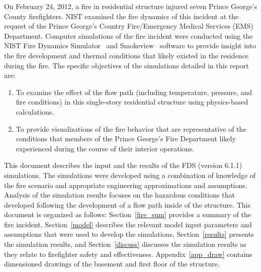 \documentclass[12pt,oneside]{book}
\begin{document}
On February 24, 2012, a fire in residential structure injured seven Prince George's County firefighters. NIST examined the fire dynamics of this incident at the request of the Prince George's Country Fire/Emergency Medical Services (EMS) Department. Computer simulations of the fire incident were conducted using the NIST Fire Dynamics Simulator~\cite{FDS_Users_Guide} and Smokeview~\cite{Smokeview_Users_Guide}  software to provide insight into the fire development and thermal conditions that likely existed in the residence during the fire. The specific objectives of the simulations detailed in this report are: 
\begin{enumerate}
\item To examine the effect of the flow path (including temperature, pressure, and fire conditions) in this single-story residential structure using physics-based calculations.
\item To provide visualizations of the fire behavior that are representative of the conditions that members of the Prince George's Fire Department likely experienced during the course of their interior operations.
\end{enumerate}

This document describes the input and the results of the FDS (version 6.1.1) simulations. The simulations were developed using a combination of knowledge of the fire scenario and appropriate engineering approximations and assumptions. Analysis of the simulation results focuses on the hazardous conditions that developed following the development of a flow path inside of the structure. This document is organized as follows: Section~\ref{fire_sum} provides a summary of the fire incident, Section~\ref{model} describes the relevant model input parameters and assumptions that were used to develop the simulations, Section~\ref{results} presents the simulation results, and Section~\ref{discuss} discusses the simulation results as they relate to firefighter safety and effectiveness. Appendix~\ref{app_draw} contains dimensioned drawings of the basement and first floor of the structure.
\end{document}
